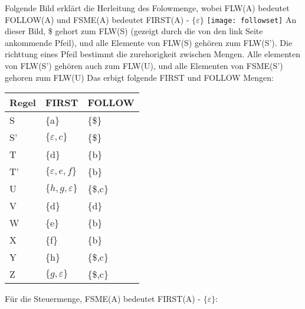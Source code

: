 \documentclass[11pt]{scrartcl}
\begin{document}
		Folgende Bild erklärt die Herleitung des Folowmenge, wobei FLW(A) bedeutet FOLLOW(A) und FSME(A) bedeutet FIRST(A) - $ \{\varepsilon\} $
		\newline
		\newline
		\texttt{[image: followset]}
		\newline
		An dieser Bild, \$ gehort zum FLW(S) (gezeigt durch die von den link Seite ankommende Pfeil), und alle Elemente von FLW(S) gehören zum FLW(S'). Die richttung eines Pfeil bestimmt die zurehorigkeit zwischen Mengen. Alle elementen von FLW(S') gehören auch zum FLW(U), und alle Elementen von FSME(S') gehoren zum FLW(U) Das erbigt folgende FIRST und FOLLOW Mengen:
		\newline
		\newline
	\begin{tabular}{l|l|l}
		Regel & FIRST & FOLLOW \\ \hline
		S & \{a\} & \{\$\}  \\
		S' & $\{\varepsilon,c\}$ & \{\$\}  \\
		T & \{d\} & \{b\}   \\
		T' & $\{\varepsilon,e,f\}$ & \{b\}   \\
		U & $\{h, g, \varepsilon\}$ & \{\$,c\} \\
		V & \{d\} & \{d\} \\
		W & \{e\} & \{b\} \\
		X & \{f\} & \{b\} \\
		Y & \{h\} & \{\$,c\} \\
		Z & $\{g,\varepsilon\}$ & \{\$,c\} 
	\end{tabular}
	\newline


	Für die Steuermenge, FSME(A) bedeutet FIRST(A) - $ \{\varepsilon\}$:
	
\end{document}
